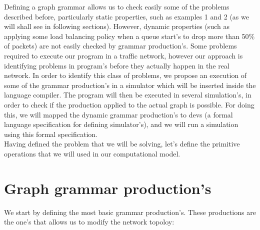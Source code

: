 \documentclass[envcountsect,runningheads]{llncs}
\begin{document}
Defining a graph grammar allows us to check easily some of the problems described 
before, particularly static properties, such as examples 1 and 2 (as we will shall see in following
sections). However, dynamic properties (such as applying some load balancing policy when a 
queue start's to drop more than 50\% of packets) are not easily checked by grammar 
production's. Some problems required to execute our program in a traffic network, 
however our approach is identifying problems in program's before they actually 
happen in the real network. In order to identify this class of problems, we 
propose an execution of some of the grammar production's in a simulator which 
will be inserted inside the language compiler. The program will then be executed 
in several simulation's, in order to check if the production applied to the actual graph is 
possible. For doing this, we will mapped the dynamic grammar production's to 
devs (a formal language specification for defining simulator's), and we will run a simulation 
using this formal specification.\\
Having defined the problem that we will be solving, let's define the primitive 
operations that we will used in our computational model.

\section{Graph grammar production's}

We start by defining the most basic grammar production's. These 
productions are the one's that allows us to modify the network topoloy:
\end{document}
